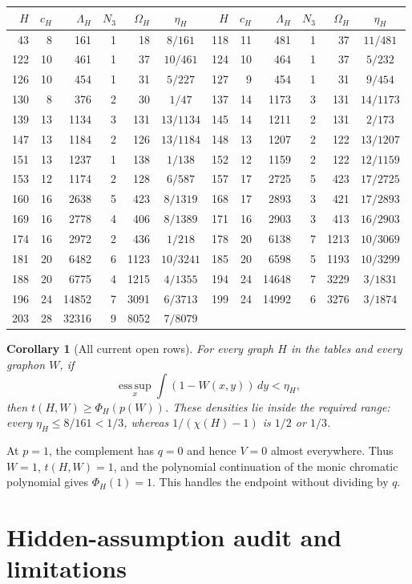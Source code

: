 \documentclass[11pt]{article}
\newtheorem{corollary}[theorem]{Corollary}
\newcommand{\dd}{\,d}
\begin{document}
\scriptsize
\begin{longtable}{r|rrrr|c@{\qquad}r|rrrr|c}
$H$&$c_H$&$\Lambda_H$&$N_3$&$\Omega_H$&$\eta_H$&
$H$&$c_H$&$\Lambda_H$&$N_3$&$\Omega_H$&$\eta_H$\\ \hline
43&8&161&1&18&$8/161$&118&11&481&1&37&$11/481$\\
122&10&461&1&37&$10/461$&124&10&464&1&37&$5/232$\\
126&10&454&1&31&$5/227$&127&9&454&1&31&$9/454$\\
130&8&376&2&30&$1/47$&137&14&1173&3&131&$14/1173$\\
139&13&1134&3&131&$13/1134$&145&14&1211&2&131&$2/173$\\
147&13&1184&2&126&$13/1184$&148&13&1207&2&122&$13/1207$\\
151&13&1237&1&138&$1/138$&152&12&1159&2&122&$12/1159$\\
153&12&1174&2&128&$6/587$&157&17&2725&5&423&$17/2725$\\
160&16&2638&5&423&$8/1319$&168&17&2893&3&421&$17/2893$\\
169&16&2778&4&406&$8/1389$&171&16&2903&3&413&$16/2903$\\
174&16&2972&2&436&$1/218$&178&20&6138&7&1213&$10/3069$\\
181&20&6482&6&1123&$10/3241$&185&20&6598&5&1193&$10/3299$\\
188&20&6775&4&1215&$4/1355$&194&24&14648&7&3229&$3/1831$\\
196&24&14852&7&3091&$6/3713$&199&24&14992&6&3276&$3/1874$\\
203&28&32316&9&8052&$7/8079$&&&&&&
\end{longtable}
\normalsize

\begin{corollary}[All current open rows]
For every graph $H$ in the tables and every graphon $W$, if
\[
 \operatorname*{ess\,sup}_{x}\int(1-W(x,y))\dd y<\eta_H,
\]
then $t(H,W)\geq\Phi_H(p(W))$.  These densities lie inside the required
range: every $\eta_H\leq8/161<1/3$, whereas
$1/(\chi(H)-1)$ is $1/2$ or $1/3$.
\end{corollary}

At $p=1$, the complement has $q=0$ and hence $V=0$ almost everywhere.
Thus $W=1$, $t(H,W)=1$, and the polynomial continuation of the monic
chromatic polynomial gives $\Phi_H(1)=1$.  This handles the endpoint without
dividing by $q$.


\section{Hidden-assumption audit and limitations}
\end{document}
